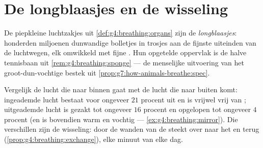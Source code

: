 \section{De longblaasjes en de wisseling}

\begin{definition}[Longblaasjes]\label{def:g7:lungs-and-gas-exchange:alveoli}
De piepkleine luchtzakjes uit \cref{def:g4:breathing:organs} zijn de
\emph{longblaasjes}: honderden miljoenen dunwandige
bolletjes in trosjes aan de fijnste uiteinden van de luchtwegen, elk
omwikkeld met fijne . Hun opgetelde oppervlak is de halve
tennisbaan uit \cref{rem:g4:breathing:sponge} --- de menselijke uitvoering
van het groot-dun-vochtige bestek uit
\cref{prop:g7:how-animals-breathe:spec}.
\end{definition}

\begin{proposition}\label{prop:g7:lungs-and-gas-exchange:numbers}
Vergelijk de lucht die naar binnen gaat met de lucht die naar buiten
komt: ingeademde lucht bestaat voor ongeveer $21$ procent uit  en
is vrijwel vrij van ; uitgeademde lucht is gezakt tot
ongeveer $16$ procent  en opgelopen tot ongeveer $4$ procent
 (en is bovendien warm en vochtig ---
\cref{ex:g4:breathing:mirror}). Die verschillen zijn de wisseling: door de
wanden van de  steekt  over naar het  en
 terug
(\cref{prop:g4:breathing:exchange}), elke minuut van elke dag.
\end{proposition}
\admitted


